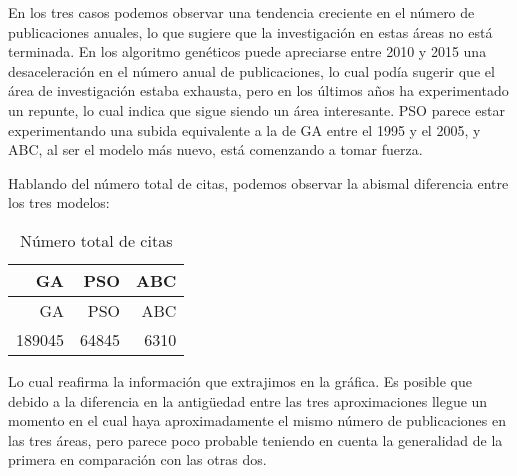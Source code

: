 \documentclass[
  a4paper,
,tablecaptionabove
]{scrartcl}
\begin{document}
En los tres casos podemos observar una tendencia creciente en el número
de publicaciones anuales, lo que sugiere que la investigación en estas
áreas no está terminada. En los algoritmo genéticos puede apreciarse
entre 2010 y 2015 una desaceleración en el número anual de
publicaciones, lo cual podía sugerir que el área de investigación estaba
exhausta, pero en los últimos años ha experimentado un repunte, lo cual
indica que sigue siendo un área interesante. PSO parece estar
experimentando una subida equivalente a la de GA entre el 1995 y el
2005, y ABC, al ser el modelo más nuevo, está comenzando a tomar fuerza.

Hablando del número total de citas, podemos observar la abismal
diferencia entre los tres modelos:

\begin{longtable}[]{@{}rrr@{}}
\caption{Número total de citas}\tabularnewline
\toprule
GA & PSO & ABC\tabularnewline
\midrule
\endfirsthead
\toprule
GA & PSO & ABC\tabularnewline
\midrule
\endhead
189045 & 64845 & 6310\tabularnewline
\bottomrule
\end{longtable}

Lo cual reafirma la información que extrajimos en la gráfica. Es posible
que debido a la diferencia en la antigüedad entre las tres
aproximaciones llegue un momento en el cual haya aproximadamente el
mismo número de publicaciones en las tres áreas, pero parece poco
probable teniendo en cuenta la generalidad de la primera en comparación
con las otras dos.
\end{document}
